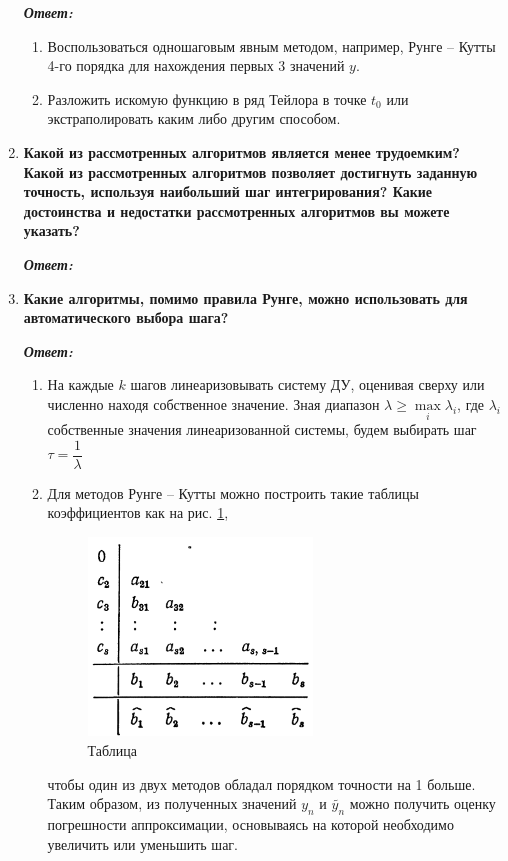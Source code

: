 \documentclass[12pt, a4paper]{article}
\begin{document}
\begin{enumerate}
		\textit{\textbf{Ответ:}}
		
		\begin{enumerate}
			\item Воспользоваться одношаговым явным методом, например, Рунге -- Кутты 4-го порядка для нахождения первых 3 значений $y$.
			\item Разложить искомую функцию в ряд Тейлора в точке $t_0$ или экстраполировать каким либо другим способом. 
		\end{enumerate}
		
		\item \textbf{ Какой из рассмотренных алгоритмов является менее трудоемким? Какой из рассмотренных алгоритмов позволяет достигнуть заданную точность, используя наибольший шаг интегрирования? Какие достоинства и недостатки рассмотренных алгоритмов вы можете указать?}
		\vspace*{0.2cm}
		
		\textit{\textbf{Ответ:}}
		
		\item \textbf{Какие алгоритмы, помимо правила Рунге, можно использовать для автоматического выбора шага?}
		\vspace*{0.2cm}
		
		\textit{\textbf{Ответ:}}
		\begin{enumerate}
			\item На каждые $k$ шагов линеаризовывать систему ДУ, оценивая сверху или численно находя собственное значение. Зная диапазон $\lambda \ge \max\limits_{i}\lambda_i$, где $\lambda_i$ собственные значения линеаризованной системы, будем выбирать шаг $\tau = \dfrac{1}{\lambda}$ 
			
			\item Для методов Рунге -- Кутты можно построить такие таблицы коэффициентов как на рис. \ref{fig:Special-Butcher}, 
			\begin{figure}[h]
				\centering
				\includegraphics[width=0.6\textwidth]{butcher_table_sp}
				\caption{Таблица }
				\label{fig:Special-Butcher}
			\end{figure}
			 чтобы один из двух методов обладал порядком точности на 1 больше. Таким образом, из полученных значений $y_n$ и $\tilde{y_n}$ можно получить оценку погрешности аппроксимации, основываясь на которой необходимо увеличить или уменьшить шаг.
		\end{enumerate}
		
	\end{enumerate}

	
	
	
	
\end{document}
